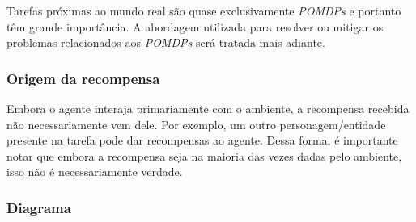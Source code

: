 \documentclass{article}
\begin{document}
                Tarefas próximas ao mundo real são quase exclusivamente \emph{POMDPs} e portanto têm grande importância. A abordagem utilizada para resolver ou mitigar os problemas relacionados aos \emph{POMDPs} será tratada mais adiante.

            \subsubsection{Origem da recompensa}
            
                Embora o agente interaja primariamente com o ambiente, a recompensa recebida não necessariamente vem dele. Por exemplo, um outro personagem/entidade presente na tarefa pode dar recompensas ao agente. Dessa forma, é importante notar que embora a recompensa seja na maioria das vezes dadas pelo ambiente, isso não é necessariamente verdade.

            \subsubsection{Diagrama}
\end{document}
